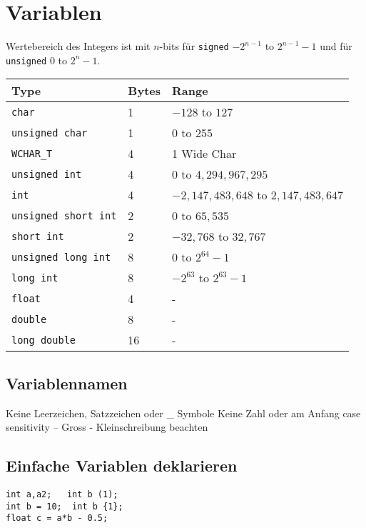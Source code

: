 \section{Variablen}
Wertebereich des Integers ist mit $n$-bits für \texttt{signed} $-2^{n-1}$ to $2^{n-1}-1$ und für \texttt{unsigned} $0$ to $2^{n}-1$.
\begin{center}
	\begin{tabular}{ | m{2.4cm} | m{0.6cm}| m{2.6cm} | } 
		\hline
		Type & Bytes & Range\\
		\hline\hline
		\texttt{char} & 1 & $-128$ to $127$ \\ 
		\texttt{unsigned char} & 1 & $0$ to $255$ \\ 
		\texttt{WCHAR\_T} & 4 & 1 Wide Char \\ 
		\hline
		\texttt{unsigned int} & 4 & $0$ to $ 4,294,967,295$ \\ 
		\texttt{int} & 4 & $-2,147,483,648$ to $2,147,483,647$ \\ 
		\texttt{unsigned short int} & 2 & $0$ to $65,535$ \\
		\texttt{short int} & 2 & $-32,768$ to $32,767$ \\  
		\texttt{unsigned long int} & 8 & $0$ to $2^{64}-1$ \\ 
		\texttt{long int} & 8 & $-2^{63}$ to $2^{63}-1$ \\
		\hline
		\texttt{float} & 4 & - \\ 
		\texttt{double} & 8 & - \\
		\texttt{long double} &16 & - \\
		\hline
	\end{tabular}
\end{center}


\subsection{Variablennamen}
Keine Leerzeichen, Satzzeichen oder \_ Symbole Keine Zahl oder am Anfang case sensitivity – Gross - Kleinschreibung beachten

\subsection{Einfache Variablen deklarieren}
\begin{lstlisting}
int a,a2;   int b (1);
int b = 10;  int b {1};
float c = a*b - 0.5;
\end{lstlisting}
